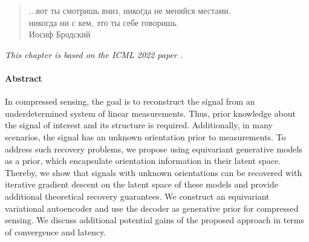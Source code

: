 \begin{quote}
\normalsize\itshape
\begin{flushright}
\foreignlanguage{russian}{...вот ты смотришь вниз, никогда не меняйся местами,}\\
\foreignlanguage{russian}{никогда ни с кем, это ты себе говоришь.}  \\
\foreignlanguage{russian}{Иосиф Бродский} \\ \vskip 20pt
\end{flushright}
\end{quote}

\begin{flushright}
	\small{
		\textit{
			\hfill This chapter is based on the ICML 2022 paper \citep{kuzina2022equivariant}.
		} 
		
	}
\end{flushright}

\paragraph{Abstract}
In compressed sensing, the goal is to reconstruct the signal from an underdetermined system of linear measurements. Thus, prior knowledge about the signal of interest and its structure is required. Additionally, in many scenarios, the signal has an unknown orientation prior to measurements. To address such recovery problems, we propose using equivariant generative models as a prior, which encapsulate orientation information in their latent space. Thereby, we show that signals with unknown orientations can be recovered with iterative gradient descent on the latent space of these models and provide additional theoretical recovery guarantees. We construct an equivariant variational autoencoder and use the decoder as generative prior for compressed sensing. We discuss additional potential gains of the proposed approach in terms of convergence and latency. 

\newpage




% 

